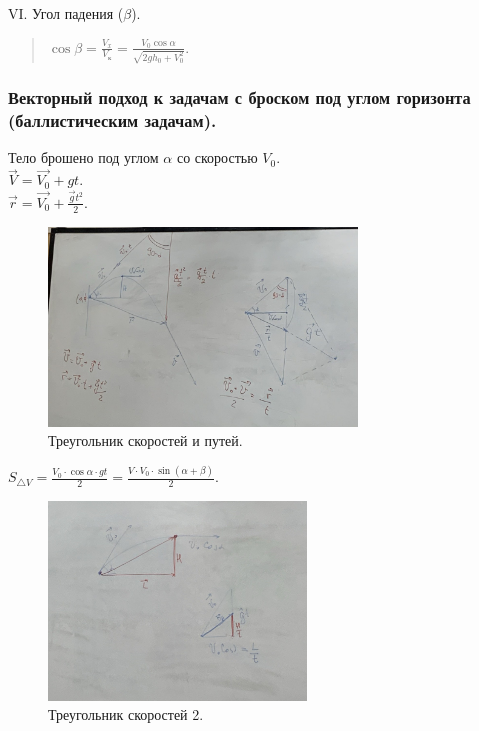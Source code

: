 \documentclass[12pt]{article}
\begin{document}
	VI. Угол падения ($\beta$).
	\begin{quote}
		$\cos\beta = \frac{V_x}{V_{\text{к}}} = \frac{V_0 \cos\alpha}{\sqrt{2gh_0 + V_0^2}}$.
	\end{quote}
	\subsubsection{Векторный подход к задачам с броском под углом горизонта (баллистическим задачам).}
	Тело брошено под углом $\alpha$ со скоростью $V_0$. \\
	$\vec{V} = \vec{V_0} + gt$. \\
	$\vec{r} = \vec{V_0} + \frac{\vec{g}t^2}{2}$.
	\begin{figure}[H]
		\includegraphics[height=200px]{extra-materials/Скорости_Вектора_1}
		\caption{Треугольник скоростей и путей.}
	\end{figure}
	$S_{\triangle V} = \frac{V_0 \cdot \cos\alpha \cdot gt}{2} = \frac{V \cdot V_0 \cdot \sin(\alpha + \beta)}{2}$.
	\begin{figure}[H]
		\includegraphics[height=200px]{extra-materials/Скорости_Вектора_2}
		\caption{Треугольник скоростей 2.}
	\end{figure}
\end{document}
